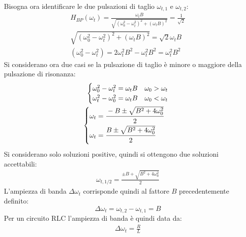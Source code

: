 \documentclass{article}
\numberwithin{equation}{subsection}
\begin{document}
Bisogna ora identificare le due pulsazioni di taglio $\omega_{t,1}$ e $\omega_{t,2}$:
\begin{gather*}
    H_{BP}(\omega_t)=\displaystyle\frac{\omega_t B}{\sqrt{(\omega_0^2-\omega_t^2)^2+(\omega_t B)^2}}=\frac{1}{\sqrt2}\\
    \sqrt{(\omega_0^2-\omega_t^2)^2+(\omega_t B)^2}=\sqrt2 \omega_tB\\
    (\omega_0^2-\omega_t^2)=2\omega_t^2B^2-\omega_t^2B^2=\omega_t^2B^2
\end{gather*}
Si considerano ora due casi se la pulsazione di taglio è minore o maggiore della pulsazione di risonanza:
\begin{gather*}
    \begin{cases}
        \omega_0^2-\omega_t^2=\omega_tB&\omega_0>\omega_t\\
        \omega_t^2-\omega_0^2=\omega_tB&\omega_0<\omega_t
    \end{cases}\\
    \begin{cases}
        \omega_t=\displaystyle\frac{\strut -B\pm\sqrt{B^2+4\omega_0^2}}{\strut2}\\
        \omega_t=\displaystyle\frac{\strut B\pm\sqrt{B^2+4\omega_0^2}}{\strut2}
    \end{cases}
\end{gather*}
Si considerano solo soluzioni positive, quindi si ottengono due soluzioni accettabili:
\begin{gather*}
    \omega_{t,1/2}=\displaystyle\frac{\pm B+\sqrt{B^2+4\omega_0^2}}{2}
\end{gather*}
L'ampiezza di banda $\Delta\omega_t$ corrisponde quindi al fattore $B$ precedentemente definito:
\begin{equation}
    \Delta\omega_t=\omega_{t,2}-\omega_{t,1}=B
\end{equation}
Per un circuito RLC l'ampiezza di banda è quindi data da:
\begin{gather*}
    \Delta\omega_t=\displaystyle\frac{R}{L}
\end{gather*}
\end{document}
